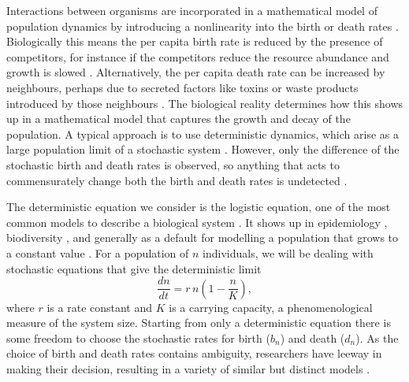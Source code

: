 Interactions between organisms are incorporated in a mathematical model of population dynamics by introducing a nonlinearity into the birth or death rates \cite{Greenhalgh1990,Ovaskainen2010,Assaf2010,Allen2003,Norden1982,Newman2004,Allen2005,Fujita1953,Nasell2001}. %
Biologically this means the per capita birth rate is reduced by the presence of competitors, for instance if the competitors reduce the resource abundance and growth is slowed \cite{Nadell2008,Vulic2001}. 
Alternatively, the per capita death rate can be increased by neighbours, perhaps due to secreted factors like toxins or waste products introduced by those neighbours \cite{Greenhalgh1990,VanMelderen2009,Rankin2012}. 
The biological reality determines how this shows up in a mathematical model that captures the growth and decay of the population. 
A typical approach is to use deterministic dynamics, which arise as a large population limit of a stochastic system \cite{Nisbet1982,Gardiner2004,Rouzine2001}. %
However, only the difference of the stochastic birth and death rates is observed, so anything that acts to commensurately change both the birth and death rates is undetected \cite{Norden1982,Nasell2001}. 

The deterministic equation we consider is the logistic equation, one of the most common models to describe a biological system \cite{Ovaskainen2010,Newman2004,Allen2005,Assaf2009}.
It shows up in epidemiology \cite{Assaf2009,Greenhalgh1990}, biodiversity \cite{Hubbell2001,Adler2010,Kessler2007}, and generally as a default for modelling a population that grows to a constant value \cite{Brock2006}. 
For a population of $n$ individuals, we will be dealing with stochastic equations that give the deterministic limit
\begin{equation}
 \frac{dn}{dt} = r\,n\left(1-\frac{n}{K}\right),
 \label{logistic}
\end{equation}
where $r$ is a rate constant and $K$ is a carrying capacity, a phenomenological measure of the system size.
Starting from only a deterministic equation there is some freedom to choose the stochastic rates for birth ($b_n$) and death ($d_n$).
As the choice of birth and death rates contains ambiguity, researchers have leeway in making their decision, resulting in a variety of similar but distinct models \cite{Newman2004,Allen2005,Assaf2009}.

